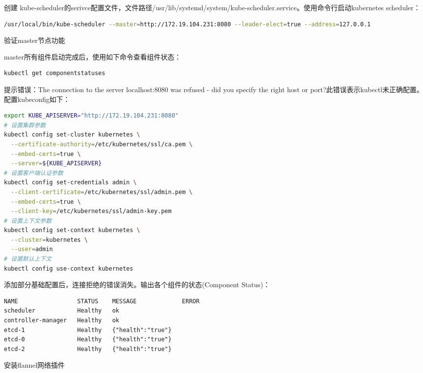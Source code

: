 \documentclass[8pt]{book}
\makeatletter
\numberwithin{dummy}{section}
\theoremstyle{ocrenumbox}
\theoremstyle{blacknumex}
\theoremstyle{blacknumbox}
\theoremstyle{ocrenum}
\renewcommand{\subsubsection}{\@startsection {subsubsection}{3}{\z@}
	{-2ex \@plus -0.1ex \@minus -.2ex}
	{.2ex \@plus.2ex }
	{\normalfont\small\sffamily\bfseries}}
\renewcommand\paragraph{\@startsection{paragraph}{4}{\z@}
	{-2ex \@plus-.2ex \@minus .2ex}
	{.1ex}
	{\normalfont\small\sffamily\bfseries}}
\makeatother
\begin{document}
创建 kube-scheduler的serivce配置文件，文件路径/usr/lib/systemd/system/kube-scheduler.service。使用命令行启动kubernetes scheduler：

\begin{lstlisting}[language=Bash]
/usr/local/bin/kube-scheduler --master=http://172.19.104.231:8080 --leader-elect=true --address=127.0.0.1
\end{lstlisting}


\paragraph{验证master节点功能}

master所有组件启动完成后，使用如下命令查看组件状态：

\begin{lstlisting}[language=Bash]
kubectl get componentstatuses
\end{lstlisting}

提示错误：The connection to the server localhost:8080 was refused - did you specify the right host or port?此错误表示kubectl未正确配置。配置kubeconfig如下：

\begin{lstlisting}[language=Bash]
export KUBE_APISERVER="http://172.19.104.231:8080"
# 设置集群参数
kubectl config set-cluster kubernetes \
  --certificate-authority=/etc/kubernetes/ssl/ca.pem \
  --embed-certs=true \
  --server=${KUBE_APISERVER}
# 设置客户端认证参数
kubectl config set-credentials admin \
  --client-certificate=/etc/kubernetes/ssl/admin.pem \
  --embed-certs=true \
  --client-key=/etc/kubernetes/ssl/admin-key.pem
# 设置上下文参数
kubectl config set-context kubernetes \
  --cluster=kubernetes \
  --user=admin
# 设置默认上下文
kubectl config use-context kubernetes
\end{lstlisting}

添加部分基础配置后，连接拒绝的错误消失。输出各个组件的状态(Component Status)：

\begin{lstlisting}
NAME                 STATUS    MESSAGE             ERROR
scheduler            Healthy   ok
controller-manager   Healthy   ok
etcd-1               Healthy   {"health":"true"}
etcd-0               Healthy   {"health":"true"}
etcd-2               Healthy   {"health":"true"}
\end{lstlisting}

\subsubsection{安装flannel网络插件}
\end{document}
